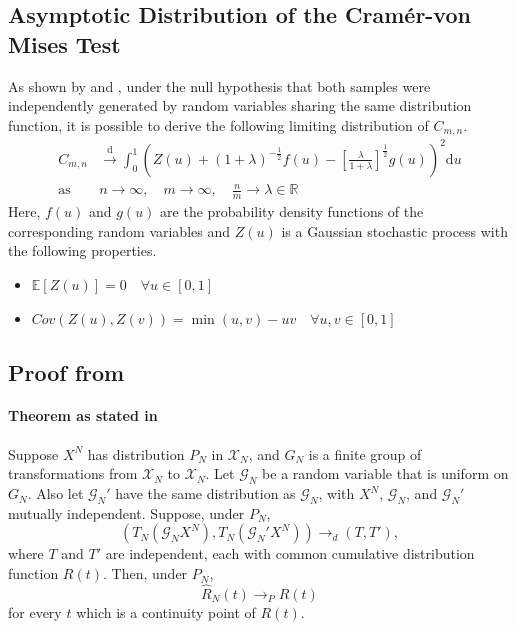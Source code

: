 \documentclass[12pt, a4paper]{article}
\theoremstyle{MAstyle} \newtheorem{assumption}{Assumption}[section]
\theoremstyle{MAstyle} \newtheorem{definition}{Definition}[section]
\theoremstyle{MAstyle} \newtheorem{theorem}{Theorem}[section]
\begin{document}
		\subsection{Asymptotic Distribution of the Cram\'{e}r-von Mises Test}\label{asymp_CvM}
			As shown by \cite{rosenblatt_limit_1952} and \cite{fisz_result_1960}, under the null hypothesis that both samples were independently generated by random variables sharing the same distribution function, it is possible to derive the following limiting distribution of $C_{m,n}$.
			\begin{equation}
				\begin{split}
					C_{m,n} &\xrightarrow{\text{d}} \int_{0}^{1} \left(Z(u) + \left(1 + \lambda\right)^{-\frac{1}{2}} f(u) - \left[\frac{\lambda}{1+\lambda}\right]^{\frac{1}{2}}g(u)\right)^2 \mathrm{d}u \\
					\text{as} \quad &n \rightarrow \infty, \quad m \rightarrow \infty, \quad \frac{n}{m} \rightarrow \lambda \in \mathbb{R}
				\end{split}
			\end{equation}
			Here, $f(u)$ and $g(u)$ are the probability density functions of the corresponding random variables and $Z(u)$ is a Gaussian stochastic process with the following properties.
			\begin{itemize}
				\item $\mathbb{E}\left[Z(u)\right] = 0 \quad \forall u \in [0,1]$
				\item $Cov\left(Z(u), Z(v)\right) = \min(u,v) - uv \quad \forall u,v \in [0,1]$
			\end{itemize}
		
		\subsection{Proof from \cite{hoeffding_large-sample_1952}}\label{hoeffding}
			\paragraph{Theorem as stated in \cite{lehmann_testing_2005} \\}
			Suppose $X^N$ has distribution $P_N$ in $\mathcal{X}_N$, and $G_N$ is a finite group of transformations from $\mathcal{X}_N$ to $\mathcal{X}_N$. Let $\mathcal{G}_N$ be a random variable that is uniform on $G_N$. Also let $\mathcal{G}_N'$ have the same distribution as $\mathcal{G}_N$, with $X^N$, $\mathcal{G}_N$, and $\mathcal{G}_N'$ mutually independent. Suppose, under $P_N$,
			\begin{equation}\label{convergence_hypo}
				\left(T_N(\mathcal{G}_N X^N), T_N(\mathcal{G}_N' X^N)\right) \rightarrow_d (T, T'),
			\end{equation}
			where $T$ and $T'$ are independent, each with common cumulative distribution function $R(t)$. Then, under $P_N$,
			\begin{equation}
				\hat{R}_N(t) \rightarrow_P R(t)
			\end{equation}
			for every $t$ which is a continuity point of $R(t)$.
		
\end{document}
